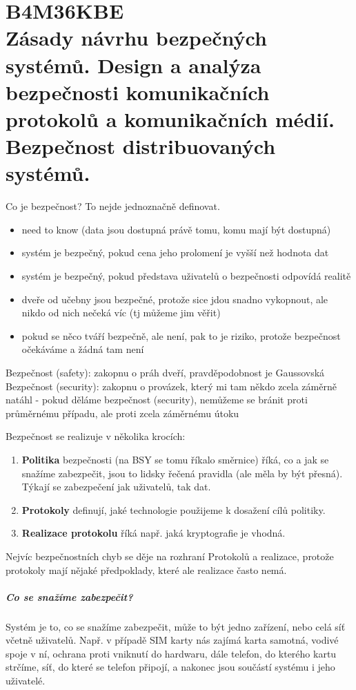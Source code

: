  \chapter[Komunikační bezpečnost]{B4M36KBE \\[1ex]\Large{Zásady návrhu bezpečných systémů. Design a analýza bezpečnosti komunikačních protokolů a komunikačních médií. Bezpečnost distribuovaných systémů.}}
 
Co je bezpečnost? To nejde jednoznačně definovat.
\begin{itemize}
\item need to know (data jsou dostupná právě tomu, komu mají být dostupná)
\item systém je bezpečný, pokud cena jeho prolomení je vyšší než hodnota dat
\item systém je bezpečný, pokud představa uživatelů o bezpečnosti odpovídá realitě
\item dveře od učebny jsou bezpečné, protože sice jdou snadno vykopnout, ale nikdo od nich nečeká víc (tj můžeme jim věřit)
\item pokud se něco tváří bezpečně, ale není, pak to je riziko, protože bezpečnost očekáváme a žádná tam není
\end{itemize}

Bezpečnost (safety): zakopnu o práh dveří, pravděpodobnost je Gaussovská
Bezpečnost (security): zakopnu o provázek, který mi tam někdo zcela záměrně natáhl
 - pokud děláme bezpečnost (security), nemůžeme se bránit proti průměrnému případu, ale proti zcela záměrnému útoku

Bezpečnost se realizuje v několika krocích:
\begin{enumerate}
\item \textbf{Politika} bezpečnosti (na BSY se tomu říkalo směrnice) říká, co a jak se snažíme zabezpečit, jsou to lidsky řečená pravidla (ale měla by být přesná). Týkají se zabezpečení jak uživatelů, tak dat.
\item \textbf{Protokoly} definují, jaké technologie použijeme k dosažení cílů politiky.
\item \textbf{Realizace protokolu} říká např. jaká kryptografie je vhodná.
\end{enumerate}
 
Nejvíc bezpečnostních chyb se děje na rozhraní Protokolů a realizace, protože protokoly mají nějaké předpoklady, které ale realizace často nemá.

\paragraph{Co se snažíme zabezpečit?} Systém je to, co se snažíme zabezpečit, může to být jedno zařízení, nebo celá síť včetně uživatelů. Např. v případě SIM karty nás zajímá karta samotná, vodivé spoje v ní, ochrana proti vniknutí do hardwaru, dále telefon, do kterého kartu strčíme, síť, do které se telefon připojí, a nakonec jsou součástí systému i jeho uživatelé.

